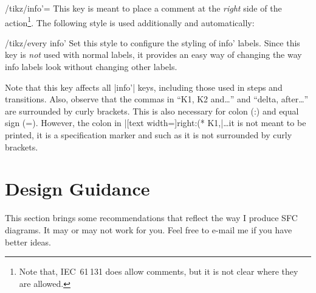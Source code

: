 \documentclass[a4paper]{ltxdoc}
\begin{document}
\begin{key}{/tikz/info'=}
  This key is meant to place a comment at the \emph{right} side of the action\footnote{Note that, IEC~61\,131 does allow comments, but it is not clear where they are allowed.}. The following style is used additionally and automatically:
  \begin{stylekey}{/tikz/every info'}
    Set this style to configure the styling of info' labels. Since this
    key is \emph{not} used with normal labels, it provides an easy way
    of changing the way info labels look without changing other
    labels.
\begin{codeexample}[width=7.3cm]
\end{codeexample}
  \end{stylekey}
  Note that this key affects all |info'| keys, including those used in steps and transitions. Also, observe that the commas in ``K1, K2 and\ldots'' and ``delta, after\ldots'' are surrounded by curly brackets. This is also necessary for colon (:) and equal sign (=). However, the colon in |[text width=]right:(* K1{,}|\ldots it is not meant to be printed, it is a  specification marker and such as it is not surrounded by curly brackets.
\end{key}


\section{Design Guidance\label{sec:guidance}}

This section brings some recommendations that reflect the way I produce SFC diagrams. It may or may not work for you. Feel free to e-mail me if you have better ideas.
\end{document}

